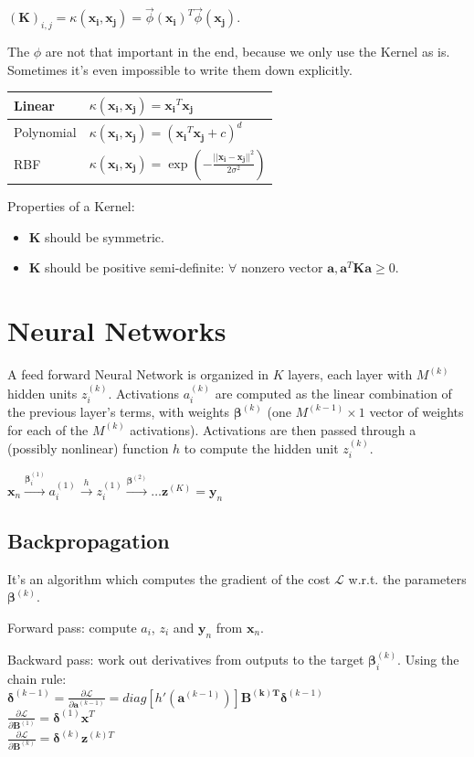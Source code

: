 \documentclass[10pt,a4paper,landscape]{article}
\providecommand{\bf}[1]{\ensuremath{\mathbf{#1}}}
\newcommand{\bbeta}{\boldsymbol\beta}
\newcommand{\bdelta}{\boldsymbol\delta}
\begin{document}
\begin{multicols*}{4}
$(\bf{K})_{i,j} = \kappa(\bf{x_i}, \bf{x_j}) = \vec \phi(\bf{x_i})^T \vec \phi(\bf{x_j})$.

The $\phi$ are not that important in the end, because we only use the Kernel as is. Sometimes it's even impossible to write them down explicitly.

\begin{tabular}{ l | l }
  \hline
  Linear     & $\kappa(\bf{x_i}, \bf{x_j}) = \bf{x_i}^T \bf{x_j}$ \\
  \hline
  Polynomial & $\kappa(\bf{x_i}, \bf{x_j}) = (\bf{x_i}^T \bf{x_j} + c)^d$ \\
  \hline
  RBF        & $\kappa(\bf{x_i}, \bf{x_j}) = \exp\left(-\frac{||\bf{x_i} - \bf{x_j}||^2}{2\sigma^2}\right)$ \\
  \hline
\end{tabular}

Properties of a Kernel:
\begin{itemize}
\item $\bf{K}$ should be symmetric.
\item $\bf{K}$ should be positive semi-definite: $\forall$ nonzero vector $\bf{a}, \bf{a}^T \bf{K} \bf{a} \geq 0$.
\end{itemize}

\section{Neural Networks}
A feed forward Neural Network is organized in $K$ layers, each layer with $M^{(k)}$ hidden units $z_i^{(k)}$. Activations $a_i^{(k)}$ are computed as the linear combination of the previous layer's terms, with weights $\bbeta^{(k)}$ (one $M^{(k-1)} \times 1$ vector of weights for each of the $M^{(k)}$ activations). Activations are then passed through a (possibly nonlinear) function $h$ to compute the hidden unit $z_i^{(k)}$.

$\bf{x}_n \xrightarrow{\bbeta_i^{(1)}} a_i^{(1)} \xrightarrow{h} z_i^{(1)} \xrightarrow{\bbeta^{(2)}} \dots \bf{z}^{(K)} = \bf{y}_n$

\subsection{Backpropagation}
It's an algorithm which computes the gradient of the cost $\mathcal{L}$ w.r.t. the parameters $\bbeta^{(k)}$.

Forward pass: compute $a_i$, $z_i$ and $\bf{y}_n$ from $\bf{x}_n$.

Backward pass: work out derivatives from outputs to the target $\bbeta_i^{(k)}$. Using the chain rule:\\
$\bdelta^{(k-1)} = \frac{\partial \mathcal{L}}{\partial \bf{a}^{(k-1)}} = diag[ h'(\bf{a}^{(k-1)}) ] \bf{B^{(k)T}} \bdelta^{(k-1)}$\\
$\frac{\partial \mathcal{L}}{\partial \bf{B}^{(1)}} = \bdelta^{(1)} \bf{x}^T$\\
$\frac{\partial \mathcal{L}}{\partial \bf{B}^{(k)}} = \bdelta^{(k)} \bf{z}^{(k)T}$


\end{multicols*}
\end{document}
